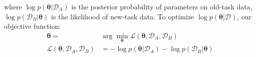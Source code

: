 \documentclass{article}
\begin{document}
where $\log p(\boldsymbol{\theta}|\mathcal D_A)$ is the posterior probability of 
parameters on old-task data,
$\log p(\mathcal D_B | \boldsymbol{\theta})$ is the likelihood of new-task data.
To optimize $\log p(\boldsymbol{\theta}|\mathcal D)$,
our objective function:
\begin{equation}
    \begin{split}
    \boldsymbol{\theta} = & \arg \min_{\boldsymbol{\theta}} \mathcal L(\boldsymbol{\theta}, \mathcal D_A, \mathcal D_B) \\
    \mathcal L(\boldsymbol{\theta}, \mathcal D_A, \mathcal D_B)  &= - \log p(\boldsymbol{\theta}|\mathcal D_A) - \log p(\mathcal D_B | \boldsymbol{\theta}) \\
    \end{split}
\end{equation}
\end{document}
